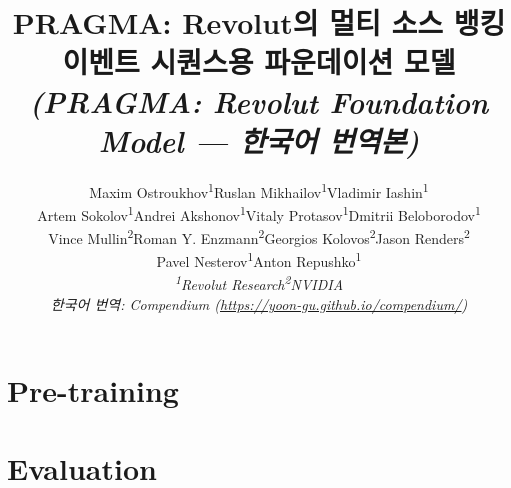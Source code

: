 \documentclass[10pt]{article}
\title{PRAGMA: Revolut의 멀티 소스 뱅킹 이벤트 시퀀스용 파운데이션 모델\\[2pt]\normalsize\normalfont\itshape (PRAGMA: Revolut Foundation Model — 한국어 번역본)}
\author{
Maxim Ostroukhov\textsuperscript{1}\qquad Ruslan Mikhailov\textsuperscript{1}\qquad Vladimir Iashin\textsuperscript{1}\\[3pt]
Artem Sokolov\textsuperscript{1}\quad Andrei Akshonov\textsuperscript{1}\quad Vitaly Protasov\textsuperscript{1}\quad Dmitrii Beloborodov\textsuperscript{1}\\[3pt]
Vince Mullin\textsuperscript{2}\quad Roman Y. Enzmann\textsuperscript{2}\quad Georgios Kolovos\textsuperscript{2}\quad Jason Renders\textsuperscript{2}\\[3pt]
Pavel Nesterov\textsuperscript{1}\qquad Anton Repushko\textsuperscript{1}\\[8pt]
{\small\itshape
\textsuperscript{1}Revolut Research\quad\quad\textsuperscript{2}NVIDIA\\[4pt]
\normalfont\rmfamily 한국어 번역: Compendium (\url{https://yoon-gu.github.io/compendium/})}
}
\renewenvironment{abstract}{\vskip.075in\noindent\ignorespaces}{\par\vskip 1ex}
\begin{document}
\begin{titleblock}
\maketitle

\begin{abstract}

\end{abstract}
\end{titleblock}



\section{Pre-training}
\label{sec:pretraining-main}





\section{Evaluation}
\label{sec:evaluation}










\end{document}

